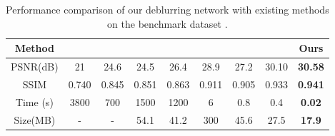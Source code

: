 \documentclass[10pt,twocolumn,letterpaper]{article}
\begin{document}
\setlength{\tabcolsep}{1.4pt}
\begin{table}[]
\centering
\begin{tabular}{|c|c|c|c|c|c|c|c|c|}
\hline

Method & \cite{xu2013unnatural} & \cite{whyte2012non} & \cite{sun2015learning} & \cite{gong2017motion} & \cite{nah2017deep} & \cite{kupyn2017deblurgan} & \cite{tao2018scale} & Ours \\
\hline
\small{PSNR(dB)} & 21 & 24.6 & 24.5 &  26.4  & 28.9 & 27.2 & 30.10 & \textbf{30.58} \\
\small{SSIM} & 0.740 & 0.845 & 0.851 & 0.863 & 0.911 & 0.905 & 0.933 & \textbf{0.941}\\
\small{Time (s)} & 3800 & 700 & 1500 & 1200 & 6 & 0.8 & 0.4 & \textbf{0.02} \\
\small{Size(MB)} & - & - & 54.1 & 41.2 & 300 & 45.6 & 27.5 & \textbf{17.9} \\
\hline
\end{tabular}
\vspace{0mm}
\caption{Performance comparison of our deblurring network with existing methods on the benchmark dataset \cite{nah2017deep}.
\vspace{-4mm}
\label{TableGopro}}
\end{table}
\setlength{\tabcolsep}{1.4pt}
\end{document}
